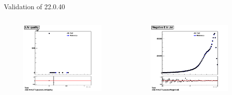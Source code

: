 \begin{frame}{Validation of 22.0.40}
    \begin{columns}
        \begin{column}{0.5\textwidth}
            \begin{figure}
                \centering
                \includegraphics[width = \textwidth]{220721_Lar}
            \end{figure}
        \end{column}
        \begin{column}{0.5\textwidth}
            \begin{figure}
                \centering
                \includegraphics[width = \textwidth]{220721_negE}

\end{figure}
\end{column}
\end{columns}
\end{frame}
